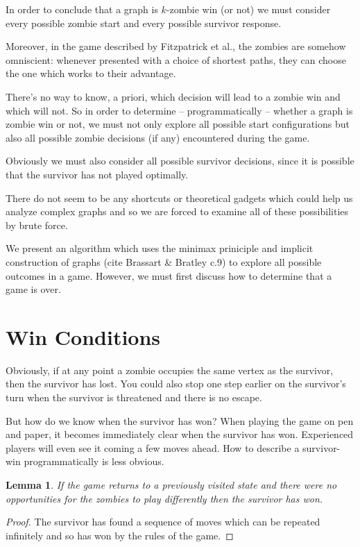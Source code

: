 \documentclass[letterpaper, 10pt]{article}
\begin{document}
\newtheorem{definition}{Definition}
\newtheorem{theorem}{Theorem}
\newtheorem{proposition}{Proposition}
\newtheorem{corollary}{Corollary}
\newtheorem{lemma}{Lemma}

In order to conclude that a graph is $k$-zombie win (or not) we must consider
every possible zombie start and every possible survivor response.

Moreover, in the game described by Fitzpatrick et al., the zombies
are somehow omniscient: whenever presented with a choice of shortest paths,
they can choose the one which works to their advantage.

There's no way to know, a priori, which decision will lead to a zombie win
and which will not. So in order to determine -- programmatically -- whether
a graph is zombie win or not, we must not only explore all possible start configurations
but also all possible zombie decisions (if any) encountered during the game.

Obviously we must also consider all possible survivor decisions, since it is possible
that the survivor has not played optimally.

There do not seem to be any shortcuts or theoretical gadgets which could help us
analyze complex graphs and so we are forced to examine all of these possibilities by
brute force.

We present an algorithm which uses the minimax priniciple and implicit construction of graphs
(cite Brassart \& Bratley c.9) to explore all possible outcomes in a game. However,
we must first discuss how to determine that a game is over.

\section{Win Conditions}

Obviously, if at any point a zombie occupies the same vertex as the survivor, then
the survivor has lost. You could also stop one step earlier on the survivor's turn
when the survivor is threatened and there is no escape.

But how do we know when the survivor has won? When playing the game on pen and
paper, it becomes immediately clear when the survivor has won.
Experienced players will even see it coming a few moves ahead. How to describe
a survivor-win programmatically is less obvious.

\begin{lemma}
  If the game returns to a previously visited state and there were no opportunities
  for the zombies to play differently then the survivor has won.
\end{lemma}
\begin{proof}
  The survivor has found a sequence of moves which can be repeated infinitely and
  so has won by the rules of the game.
\end{proof}
\end{document}
